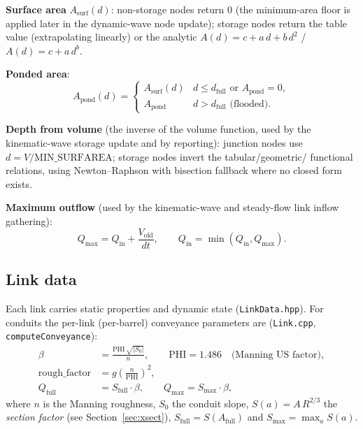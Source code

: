 \documentclass[11pt,a4paper]{article}
\begin{document}
\textbf{Surface area} $A_{\mathrm{surf}}(d)$: non-storage nodes return 0 (the
minimum-area floor is applied later in the dynamic-wave node update); storage
nodes return the table value (extrapolating linearly) or the analytic
$A(d) = c + a\,d + b\,d^{2}$ / $A(d) = c + a\,d^{b}$.

\textbf{Ponded area}:
\begin{equation}
  A_{\mathrm{pond}}(d) =
  \begin{cases}
    A_{\mathrm{surf}}(d) & d \le d_{\mathrm{full}} \text{ or } A_{\mathrm{pond}} = 0,\\
    A_{\mathrm{pond}} & d > d_{\mathrm{full}} \text{ (flooded)}.
  \end{cases}
\end{equation}

\textbf{Depth from volume} (the inverse of the volume function, used by the
kinematic-wave storage update and by reporting): junction nodes use
$d = V/\mathrm{MIN\_SURFAREA}$; storage nodes invert the tabular/geometric/
functional relations, using Newton--Raphson with bisection fallback where no
closed form exists.

\textbf{Maximum outflow} (used by the kinematic-wave and steady-flow link
inflow gathering):
\begin{equation}
  Q_{\max} = Q_{\mathrm{in}} + \frac{V_{\mathrm{old}}}{dt},
  \qquad Q_{\mathrm{in}} = \min\!\left(Q_{\mathrm{in}}, Q_{\max}\right).
\end{equation}

\subsection{Link data}

Each link carries static properties and dynamic state (\texttt{LinkData.hpp}).
For conduits the per-link (per-barrel) conveyance parameters are
(\texttt{Link.cpp}, \texttt{computeConveyance}):
\begin{align}
  \beta &= \frac{\mathrm{PHI}\,\sqrt{|S_0|}}{n}, \qquad \mathrm{PHI} = 1.486
    \quad\text{(Manning US factor)}, \\
  \mathrm{rough\_factor} &= g\left(\frac{n}{\mathrm{PHI}}\right)^{2},\\
  Q_{\mathrm{full}} &= S_{\mathrm{full}}\cdot\beta,
  \qquad Q_{\max} = S_{\max}\cdot\beta,
\end{align}
where $n$ is the Manning roughness, $S_0$ the conduit slope, $S(a) = A\,R^{2/3}$
the \emph{section factor} (see Section~\ref{sec:xsect}), $S_{\mathrm{full}} =
S(A_{\mathrm{full}})$ and $S_{\max} = \max_a S(a)$.
\end{document}
